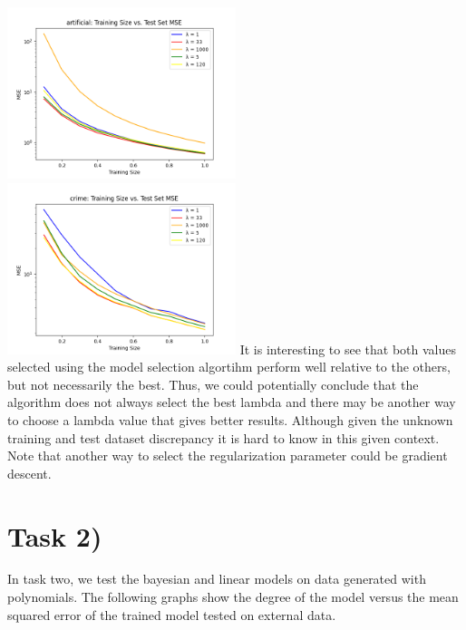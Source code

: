 \documentclass{article}
\begin{document}
\includegraphics[width=0.5\textwidth]{../output/task1iiiartificialcopy.png}
\includegraphics[width=0.5\textwidth]{../output/task1iiicrimecopy.png}
It is interesting to see that both values selected using the model selection algortihm perform well relative to the others, but not necessarily the best. Thus, we could potentially conclude that the algorithm does not always select the best lambda and there may be another way to choose a lambda value that gives better results. Although given the unknown training and test dataset discrepancy it is hard to know in this given context. Note that another way to select the regularization parameter could be gradient descent.

\section*{Task 2)}

In task two, we test the bayesian and linear models on data generated with polynomials. The following graphs show the degree of the model versus the mean squared error of the trained model tested on external data.
\end{document}
